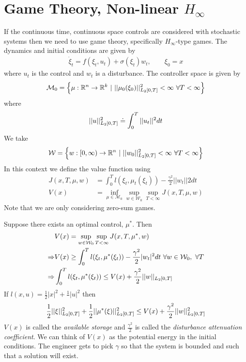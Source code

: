 \section{Game Theory, Non-linear $H_\infty$}
If the continuous time, continuous space controls are considered with stochastic systems then we need to use game theory, specifically $H_\infty$-type games.
The dynamics and initial conditions are given by
\begin{align*}
\dot{\xi}_t = f(\xi_t,u_t) + \sigma(\xi_t)w_t, \qquad \xi_0=x
\end{align*}
where $u_t$ is the control and $w_t$ is a disturbance.
The controller space is given by
$$\mathcal{M}_0 = \left\lbrace \mu:\mathbb{R}^n\to\mathbb{R}^k~|~||\mu_0(\xi_0)||^2_{L_2[0,T]}<\infty~\forall T<\infty\right\rbrace$$
where
$$||u||^2_{L_2[0,T]}\doteq\int_0^T||u_t||^2dt$$
We take
$$\mathcal{W}=\left\lbrace w:[0,\infty)\to\mathbb{R}^n~|~||w_0||^2_{L_2[0,T]}<\infty~\forall T<\infty \right\rbrace$$%
In this context we define the value function using
\begin{align*}
J(x,T,\mu,w) &= \int_0^T l(\xi_t,\mu_t(\xi_t)) - \frac{\gamma^2}{2}||w_t||2dt \\
V(x) &= \inf_{\mu\in\mathcal{M}_0}\sup_{w\in\mathcal{W}_0}\sup_{T<\infty} J(x,T,\mu,w)
\end{align*}
Note that we are only considering zero-sum games.

Suppose there exists an optimal control, $\mu^\ast$.
Then
\begin{align*}
&V(x) = \sup_{w\in\mathcal{W}_0}\sup_{T<\infty}J(x,T,\mu^\ast,w) \\
\Rightarrow &V(x) \geq \int_0^T l(\xi_t,\mu^\ast(\xi_t)) - \frac{\gamma^2}{2}|w_t|^2dt~\forall w\in\mathcal{W}_0,~\forall T \\
\Rightarrow &\int_0^T l(\xi_t,\mu^\ast(\xi_t)) \leq V(x) + \frac{\gamma^2}{2}||w||_{L_2[0,T]}
\end{align*}
If $l(x,u)  = \frac{1}{2}|x|^2+\frac{1}{}|u|^2$ then
$$\frac{1}{2}||\xi||^2_{L_2[0,T]} + \frac{1}{2}||\mu^\ast(\xi)||_{L_2[0,T]}^2 \leq V(x) + \frac{\gamma^2}{2}||w||^2_{L_2[0,T]}$$
$V(x)$ is called the \textit{available storage} and $\frac{\gamma^2}{2}$ is called the \textit{disturbance attenuation coefficient}.
We can think of $V(x)$ as the potential energy in the initial conditions.
The engineer gets to pick $\gamma$ so that the system is bounded and such that a solution will exist.

